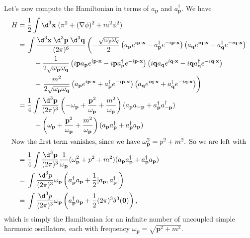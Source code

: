 \documentclass[a4paper]{article}
\begin{document}
Let's now compute the Hamiltonian in terms of $a_\mathbf{p}$ and $a_\mathbf{p}^\dagger$. We have
\begin{align*}
  H ={}& \frac{1}{2}\int \d^3 \mathbf{x}\;(\pi^2 + (\nabla \phi)^2 + m^2 \phi^2)\\
  ={}&\int \frac{\d^3 \mathbf{x}\; \d^3 \mathbf{p}\; \d^3 \mathbf{q}}{(2\pi)^6} \left(-\frac{\sqrt{\omega_p \omega_q}}{2} \left(a_\mathbf{p} e^{i\mathbf{p}\cdot \mathbf{x}} - a_\mathbf{p}^\dagger e^{-i\mathbf{p}\cdot \mathbf{x}}\right)\left(a_\mathbf{q} e^{i\mathbf{q}\cdot \mathbf{x}} - a_\mathbf{q}^\dagger e^{-i\mathbf{q}\cdot \mathbf{x}}\right)\right.\\
  &\quad+ \frac{1}{2\sqrt{\omega_\mathbf{p} \omega_\mathbf{q}}}\left(i\mathbf{p} a_\mathbf{p} e^{i\mathbf{p}\cdot \mathbf{x}} - i\mathbf{p} a_\mathbf{p}^\dagger e^{-i\mathbf{p}\cdot \mathbf{x}}\right)\left(i\mathbf{q} a_\mathbf{q} e^{i\mathbf{q}\cdot \mathbf{x}} - i\mathbf{q} a_\mathbf{q}^\dagger e^{-i\mathbf{q}\cdot \mathbf{x}}\right)\\
  &\quad+\left. \frac{m^2}{2\sqrt{\omega_\mathbf{p}\omega_\mathbf{q}}} \left(a_\mathbf{p} e^{i\mathbf{p}\cdot \mathbf{x}} + a_\mathbf{p}^\dagger e^{-i\mathbf{p}\cdot \mathbf{x}}\right)\left(a_\mathbf{q} e^{i\mathbf{q}\cdot \mathbf{x}} + a_\mathbf{q}^\dagger e^{-i\mathbf{q}\cdot \mathbf{x}}\right)\right)\\
  ={}& \frac{1}{4}\int \frac{\d^3 \mathbf{p}}{(2\pi)^3}\left(-\omega_\mathbf{p} + \frac{\mathbf{p}^2}{\omega_\mathbf{p}} + \frac{m^2}{\omega_\mathbf{p}}\right)(a_\mathbf{p} a_{-\mathbf{p}} + a_\mathbf{p}^\dagger a_{-\mathbf{p}}^\dagger)\\
  &\quad+ \left(\omega_\mathbf{p} + \frac{\mathbf{p}^2}{\omega_\mathbf{p}} + \frac{m^2}{\omega_\mathbf{p}}\right) (a_\mathbf{p} a_\mathbf{p}^\dagger + a_\mathbf{p}^\dagger a_\mathbf{p})\\
  \intertext{Now the first term vanishes, since we have $\omega_\mathbf{p}^2 = p^2 + m^2$. So we are left with}
  ={}& \frac{1}{4}\int \frac{\d^3 \mathbf{p}}{(2\pi)^3}\frac{1}{\omega_\mathbf{p}} (\omega_\mathbf{p}^2 + p^2 + m^2)(a_\mathbf{p} a_\mathbf{p}^\dagger + a_\mathbf{p}^\dagger a_\mathbf{p})\\
  ={}& \int \frac{\d^3 p}{(2\pi)^3} \omega_\mathbf{p}\left(a_\mathbf{p}^\dagger a_\mathbf{p} + \frac{1}{2}[a_\mathbf{p}, a_\mathbf{p}^\dagger]\right)\\
  ={}& \int \frac{\d^3 p}{(2\pi)^3} \omega_\mathbf{p}\left(a_\mathbf{p}^\dagger a_\mathbf{p} + \frac{1}{2}(2\pi)^3 \delta^3(\mathbf{0})\right),
\end{align*}
which is simply the Hamiltonian for an infinite number of uncoupled simple harmonic oscillators, each with frequency $\omega_\mathbf{p} = \sqrt{\mathbf{p}^2 + m^2}$.
\end{document}
